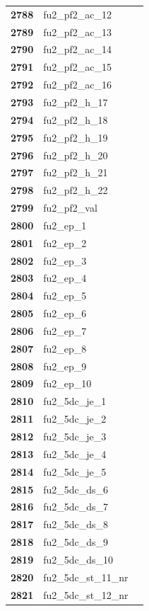 \documentclass[
  letterpaper,
  DIV=11,
  numbers=noendperiod]{scrartcl}
\begin{document}
\begin{longtable}[t]{>{}cll}
\textbf{2788} & fu2\_pf2\_ac\_12 & \\
\textbf{2789} & fu2\_pf2\_ac\_13 & \\
\textbf{2790} & fu2\_pf2\_ac\_14 & \\
\addlinespace
\textbf{2791} & fu2\_pf2\_ac\_15 & \\
\textbf{2792} & fu2\_pf2\_ac\_16 & \\
\textbf{2793} & fu2\_pf2\_h\_17 & \\
\textbf{2794} & fu2\_pf2\_h\_18 & \\
\textbf{2795} & fu2\_pf2\_h\_19 & \\
\addlinespace
\textbf{2796} & fu2\_pf2\_h\_20 & \\
\textbf{2797} & fu2\_pf2\_h\_21 & \\
\textbf{2798} & fu2\_pf2\_h\_22 & \\
\textbf{2799} & fu2\_pf2\_val & \\
\textbf{2800} & fu2\_ep\_1 & \\
\addlinespace
\textbf{2801} & fu2\_ep\_2 & \\
\textbf{2802} & fu2\_ep\_3 & \\
\textbf{2803} & fu2\_ep\_4 & \\
\textbf{2804} & fu2\_ep\_5 & \\
\textbf{2805} & fu2\_ep\_6 & \\
\addlinespace
\textbf{2806} & fu2\_ep\_7 & \\
\textbf{2807} & fu2\_ep\_8 & \\
\textbf{2808} & fu2\_ep\_9 & \\
\textbf{2809} & fu2\_ep\_10 & \\
\textbf{2810} & fu2\_5dc\_je\_1 & \\
\addlinespace
\textbf{2811} & fu2\_5dc\_je\_2 & \\
\textbf{2812} & fu2\_5dc\_je\_3 & \\
\textbf{2813} & fu2\_5dc\_je\_4 & \\
\textbf{2814} & fu2\_5dc\_je\_5 & \\
\textbf{2815} & fu2\_5dc\_ds\_6 & \\
\addlinespace
\textbf{2816} & fu2\_5dc\_ds\_7 & \\
\textbf{2817} & fu2\_5dc\_ds\_8 & \\
\textbf{2818} & fu2\_5dc\_ds\_9 & \\
\textbf{2819} & fu2\_5dc\_ds\_10 & \\
\textbf{2820} & fu2\_5dc\_st\_11\_nr & \\
\addlinespace
\textbf{2821} & fu2\_5dc\_st\_12\_nr & \\

\end{longtable}
\end{document}
